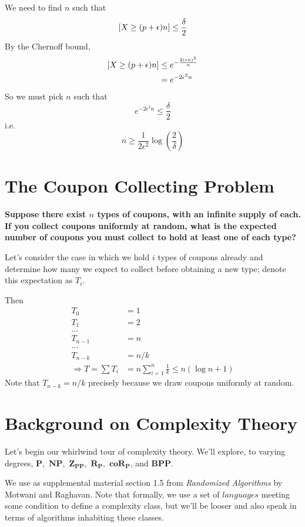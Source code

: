\documentclass[11pt]{article}
\let\Pr\relax
\DeclareMathOperator*{\Pr}{\mathbb{P}}
\newcommand{\eps}{\epsilon}
\newcommand{\Pt}{\ensuremath{\mathbf{P}}}
\newcommand{\NP}{\ensuremath{\mathbf{NP}}}
\newcommand{\BPP}{\ensuremath{\mathbf{BPP}}}
\newcommand{\ZPP}{\ensuremath{\mathbf{Z_{PP}}}}
\newcommand{\RP}{\ensuremath{\mathbf{R_{P}}}}
\newcommand{\coRP}{\ensuremath{\mathbf{coR_{P}}}}
\let\ab\allowbreak
\begin{document}
We need to find $n$ such that
$$ \Pr[X \ge (p + \eps)n] \le \frac{\delta}{2} $$
By the Chernoff bound,
\begin{align*}
  \Pr[X \ge (p + \eps)n] &\le e^{-\frac{2(\eps n)^2}{n}} \\
                         &= e^{-2\eps^2 n}
\end{align*}
So we must pick $n$ such that
$$ e^{-2\eps^2 n} \le \frac \delta 2 $$
i.e.
$$ n \ge \frac{1}{2\eps^2}\log\left(\frac{2}{\delta} \right) $$

\section{The Coupon Collecting Problem}

\textbf{Suppose there exist $n$ types of coupons, with an infinite supply of each. If you collect coupons uniformly at random, what is the expected number of coupons you must collect to hold at least one of each type?}

Let's consider the case in which we hold $i$ types of coupons already and determine how many we expect to collect before obtaining a new type; denote this expectation as $T_i$.

Then
\begin{align*}
  T_0 &= 1 \\
  T_1 &= 2 \\
  \ldots \\
  T_{n-1} &= n \\
  \ldots \\
  T_{n-k} &= n / k \\
  \Rightarrow T = \sum{T_i} &= n \sum_{i=1}^n \frac{1}{k} \leq n(\log n + 1)
\end{align*}
Note that $T_{n-k} = n / k$ precisely because we draw coupons uniformly at random.

\section{Background on Complexity Theory}

Let's begin our whirlwind tour of complexity theory. We'll explore, to varying degrees, \Pt,\ \NP,\ab\ \ZPP,\ \RP,\ \coRP, and \BPP.

We use as supplemental material section 1.5 from \textit{Randomized Algorithms} by Motwani and Raghavan.
Note that formally, we use a set of $languages$ meeting some condition to define a complexity class, but we'll be looser and also speak in terms of algorithms inhabiting these classes.
\end{document}
